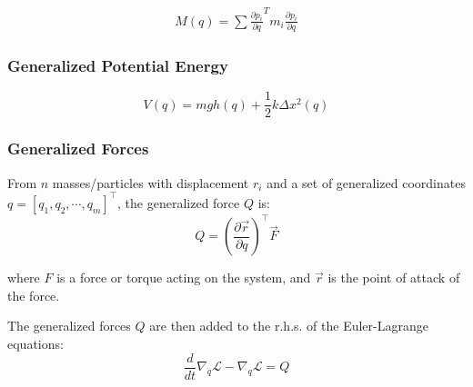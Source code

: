 \begin{equation}
\begin{aligned}
    M(q) = \sum\frac{\partial p_i}{\partial q}^Tm_i\frac{\partial p_i}{\partial q}
\end{aligned}
\end{equation}

\subsubsection{Generalized Potential Energy}
$$V(q)=mgh(q)+\frac{1}{2}k\Delta x^2(q)$$
\subsubsection{Generalized Forces}
From $n$ masses/particles with displacement $r_i$ and a set of generalized coordinates $q=\left[q_1,q_2,\cdots,q_m\right]^\top$, the generalized force $Q$ is:
\begin{equation}\label{eq:generalized_force}
Q = \left(\frac{\partial \vec r}{\partial q}\right)^\top\vec F  
\end{equation}

where $F$ is a force or torque acting on the system, and $\vec r$ is the point of attack of the force.

The generalized forces $Q$ are then added to the r.h.s. of the Euler-Lagrange equations:
$$
\frac{d}{dt}\nabla_{\dot{q}}\mathcal{L}-\nabla_q\mathcal{L}=Q
$$

